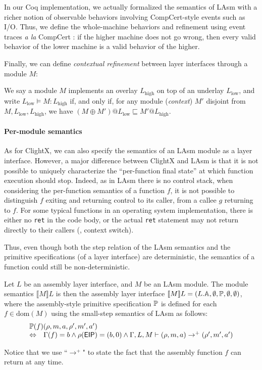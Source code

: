 In our Coq implementation, we actually formalized the semantics of
LAsm with a richer notion of observable behaviors involving
CompCert-style events such as I/O. Thus, we define the
whole-machine behaviors and refinement using event traces 
{\em a la} CompCert \cite[3.5 sqq.]{Leroy-backend}: if the higher machine does
not go wrong, then every valid behavior of the lower machine is a
valid behavior of the higher.

Finally, we can define \emph{contextual refinement} between layer interfaces through a module $M$:

\begin{definition}
We say a module $M$ implements an overlay $L_{\text{high}}$ on top of an
underlay $L_{\text{low}}$, and write $ L_{\text{low}} \vDash M :
L_{\text{high}} $ if, and only if, for any module (\emph{context}) $M'$ disjoint from $M, L_{\text{low}}, L_{\text{high}}$,
we have $(M \oplus M')@L_{\text{low}} \sqsubseteq M'@L_{\text{high}}$.
\end{definition}

\paragraph{Per-module semantics}
As for ClightX, we can also specify the semantics of an LAsm module as
a layer interface. However, a major difference between ClightX and
LAsm is that it is not possible to uniquely characterize the
``per-function final state'' at which function execution should
stop. Indeed, as in LAsm there is no control stack, when considering
the per-function semantics of a function $f$, it is not possible to
distinguish $f$ exiting and returning control to its caller, from a
callee $g$ returning to $f$. 
For some typical functions in an operating system implementation,
there is either no \verb+ret+ in the code body, or the actual 
\verb+ret+ statement may not return directly to their callers (\eg, context switch).


Thus, even though both the step relation of the LAsm 
semantics and the primitive
specifications (of a layer interface) are deterministic, 
the semantics of a function could still be non-deterministic.

\begin{definition}
Let $L$ be an
assembly layer interface, and $M$ be an LAsm module. The
module semantics $\llbracket M \rrbracket L$ %
is then the
assembly layer interface $\llbracket M \rrbracket L = (L.\mathbb{A}, \emptyset, \mathbb{P},\emptyset,\emptyset)$,
where the assembly-style primitive specification $\mathbb{P}$ is defined for each $f
\in \mathrm{dom}(M)$ using the small-step semantics of LAsm as follows:
\[
\begin{array}{ll}
\multicolumn{2}{l}{\primt(f)(\rho, m, a, \rho', m', a')} \\
\Leftrightarrow & \Gamma(f) = b \land \rho(\mathsf{EIP}) = (b, 0)  \land \Gamma, L, M \vdash (\rho, m, a) \rightarrow^+ (\rho', m', a')
\end{array}
\]
\end{definition}%
\noindent{}Notice that we use ``$\rightarrow^+$"
to state the fact that the assembly function $f$ can return at any time.

